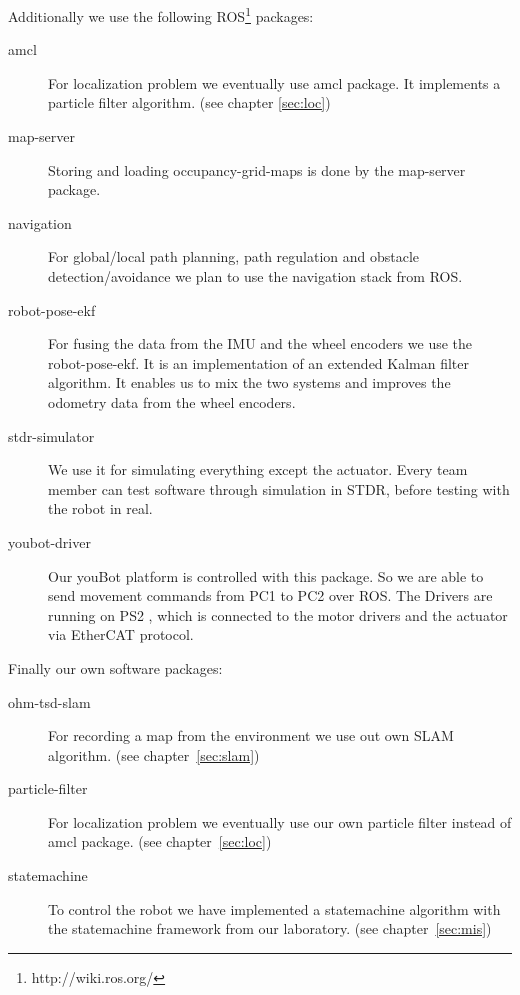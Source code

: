 \noindent Additionally we use the following ROS\footnote{http://wiki.ros.org/} packages:

\begin{description}
	\item [amcl] For localization problem we eventually use amcl package. It implements a particle filter algorithm. (see chapter \ref{sec:loc})
	\item [map-server] Storing and loading occupancy-grid-maps is done by the map-server package.
	\item [navigation] For global/local path planning, path regulation and obstacle detection/avoidance we plan to use the navigation stack from ROS.
	\item [robot-pose-ekf] For fusing the data from the IMU and the wheel encoders we use the robot-pose-ekf. It is an implementation of an extended Kalman filter algorithm. It enables us to mix the two systems and improves the odometry data from the wheel encoders.
	\item [stdr-simulator] We use it for simulating everything except the actuator. Every team member can test software through simulation in STDR, before testing with the robot in real.
	\item [youbot-driver] Our youBot platform is controlled with this package. So we are able to send movement commands from PC1 to PC2 over ROS. The Drivers are running on PS2 , which is connected to the motor drivers and the actuator via EtherCAT protocol.
\end{description}

\noindent Finally our own software packages:

\begin{description}
	\item [ohm-tsd-slam] For recording a map from the environment we use out own SLAM algorithm. (see chapter~\ref{sec:slam})
	\item [particle-filter] For localization problem we eventually use our own particle filter instead of amcl package. (see chapter~\ref{sec:loc})
	\item [statemachine] To control the robot we have implemented a statemachine algorithm with the statemachine framework from our laboratory. (see chapter~\ref{sec:mis})
\end{description}

